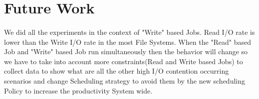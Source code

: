 \documentclass{article}
\begin{document}
\section{Future Work}
\paragraph{}We did all the experiments in the context of "Write" based Jobs. Read I/O rate is lower than the Write I/O rate in the most File Systems\cite{IOR_Performance_measurement_in_File_System}. When the "Read" based Job and "Write" based Job run simultaneously then the behavior will change so we have to take into account more constraints(Read and Write based Jobs) to collect data to show what are all the other high I/O contention occurring scenarios and change Scheduling strategy to avoid them by the new scheduling Policy to increase the productivity System wide.



\end{document}
